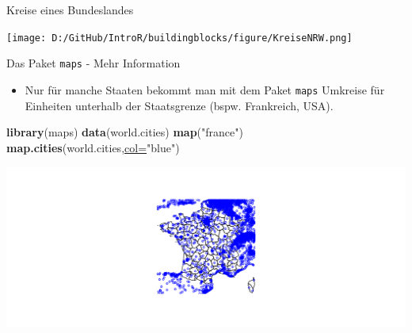\documentclass[ignorenonframetext,]{beamer}
\newenvironment{Shaded}{\begin{snugshade}}{\end{snugshade}}
\newcommand{\DataTypeTok}[1]{\textcolor[rgb]{0.74,0.68,0.62}{\underline{#1}}}
\newcommand{\DecValTok}[1]{\textcolor[rgb]{0.27,0.67,0.26}{#1}}
\newcommand{\KeywordTok}[1]{\textcolor[rgb]{0.26,0.66,0.93}{\textbf{#1}}}
\newcommand{\NormalTok}[1]{\textcolor[rgb]{0.74,0.68,0.62}{#1}}
\newcommand{\OperatorTok}[1]{\textcolor[rgb]{0.74,0.68,0.62}{#1}}
\newcommand{\StringTok}[1]{\textcolor[rgb]{0.02,0.61,0.04}{#1}}
\providecommand{\tightlist}{%
  \setlength{\itemsep}{0pt}\setlength{\parskip}{0pt}}
\begin{document}
\begin{frame}[fragile]{Kreise eines Bundeslandes}
\protect\hypertarget{kreise-eines-bundeslandes}{}

\begin{Shaded}
\end{Shaded}

\texttt{[image: D:/GitHub/IntroR/buildingblocks/figure/KreiseNRW.png]}

\end{frame}

\begin{frame}[fragile]{Das Paket \texttt{maps} - Mehr Information}
\protect\hypertarget{das-paket-maps---mehr-information}{}

\begin{itemize}
\tightlist
\item
  Nur für manche Staaten bekommt man mit dem Paket \texttt{maps}
  Umkreise für Einheiten unterhalb der Staatsgrenze (bspw. Frankreich,
  USA).
\end{itemize}

\begin{Shaded}
\begin{Highlighting}[]
\KeywordTok{library}\NormalTok{(maps)}
\KeywordTok{data}\NormalTok{(world.cities)}
\KeywordTok{map}\NormalTok{(}\StringTok{"france"}\NormalTok{)}
\KeywordTok{map.cities}\NormalTok{(world.cities,}\DataTypeTok{col=}\StringTok{"blue"}\NormalTok{)}
\end{Highlighting}
\end{Shaded}

\includegraphics{Geomedizin_files/figure-beamer/unnamed-chunk-142-1.pdf}

\end{frame}
\end{document}
